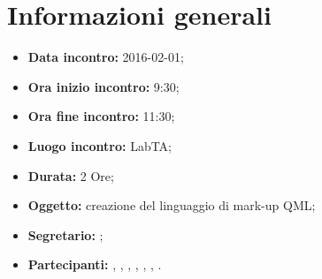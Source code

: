 \newpage
\section{Informazioni generali}
\begin{itemize}
\item \textbf{Data incontro:} 2016-02-01;
\item \textbf{Ora inizio incontro:} 9:30;
\item \textbf{Ora fine incontro:} 11:30;
\item \textbf{Luogo incontro:} LabTA;
\item \textbf{Durata:} 2 Ore;
\item \textbf{Oggetto:} creazione del linguaggio di mark-up QML;
\item \textbf{Segretario:} \SM;
\item \textbf{Partecipanti:} \AF, \FB, \GN, \GR, \MV, \MP, \SM.

\end{itemize}
